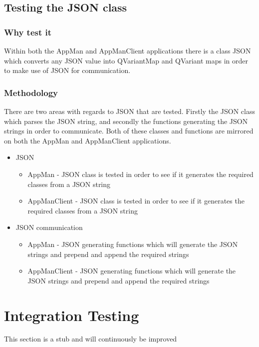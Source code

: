 \documentclass[a4paper,12pt,final]{article}
\begin{document}
\subsection{Testing the JSON class}
\subsubsection{Why test it}
Within both the AppMan and AppManClient applications there is a class JSON which converts any JSON value into QVariantMap and QVariant maps in order to make use of JSON for communication.
\subsubsection{Methodology}
There are two areas with regards to JSON that are tested. Firstly the JSON class which parses the JSON string, and secondly the functions generating the JSON strings in order to communicate. Both of these classes and functions are mirrored on both the AppMan and AppManClient applications.
\begin{itemize}
\item JSON

\begin{itemize}
\item AppMan - JSON class is tested in order to see if it generates the required classes from a JSON string
\item AppManClient - JSON class is tested in order to see if it generates the required classes from a JSON string
\end{itemize}

\item JSON communication
\begin{itemize}
\item AppMan - JSON generating functions which will generate the JSON strings and prepend and append the required strings
\item AppManClient - JSON generating functions which will generate the JSON strings and prepend and append the required strings
\end{itemize}

\end{itemize}







\section{Integration Testing}
This section is a stub and will continuously be improved
\end{document}
